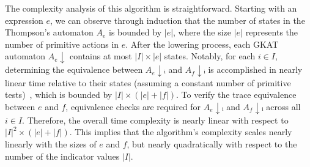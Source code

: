 The complexity analysis of this algorithm is straightforward. Starting with an expression \(e\), we can observe through induction that the number of states in the Thompson's automaton \(A_e\) is bounded by \(|e|\), where the size \(|e|\) represents the number of primitive actions in \(e\).
After the lowering process, each GKAT automaton \(A_e\!↓\) contains at most \(|I|×|e|\) states. 
Notably, for each \(i ∈ I\), determining the equivalence between \(A_e\!↓ᵢ\) and \(A_f\!↓ᵢ\) is accomplished in nearly linear time relative to their states (assuming a constant number of primitive tests)~\cite{Smolka_Foster_Hsu_Kappé_Kozen_Silva_2020}, which is bounded by \(|I|×(|e|+|f|)\).
To verify the trace equivalence between \(e\) and \(f\), equivalence checks are required for \(A_e\!↓ᵢ\) and \(A_f\!↓ᵢ\) across all \(i∈I\). 
Therefore, the overall time complexity is nearly linear with respect to \(|I|^2 × (|e|+|f|)\). 
This implies that the algorithm's complexity scales nearly linearly with the sizes of \(e\) and \(f\), but nearly quadratically with respect to the number of the indicator values \(|I|\).